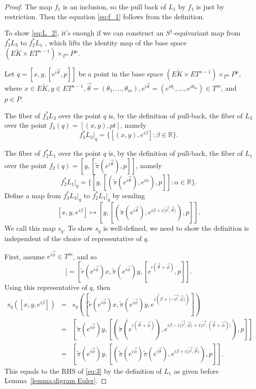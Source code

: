 \documentclass[12pt]{amsart}
\theoremstyle{definition}
\numberwithin{equation}{section}
\begin{document}
\begin{proof}
The map $f_{1}$ is an inclusion, so the pull back of $L_{1}$ by
$f_{1}$ is just by restriction. Then the equation \eqref{eq:f_1}
follows from the definition.

To show \eqref{eq:L_2}, it's enough if we can construct an
$S^1$-equivariant map from $f_{3}^{*}L_{3}$ to $f_{2}^{*}L_{1}$ ,
which lifts the identity map of the base space $(E\tilde{K}\times
ET^{n-1})\times_{T^m}P^{\mu}$.

Let $q= [x,y,[e^{i\vec{\theta}},p]]$ be a point in the base space
$(E\tilde{K}\times ET^{n-1})\times_{T^m}P^{\mu}$, where $x\in
E\tilde{K}, y\in ET^{n-1}, \vec{\theta}=(\theta_{1},...,\theta_{m}),
e^{i\vec{\theta}}=(e^{i\theta_{1}},...,e^{i\theta_{m}})\in T^m$, and
$p\in P$.

The fiber of $f_{3}^{*}L_{3}$ over the point $q$ is, by the
definition of pull-back, the fiber of $L_{3}$ over the point
$f_{3}(q)=[(x,y),pt]$, namely
\begin{equation}\label{eq:1}
f_{3}^{*}L_{3}|_{q}=\{[(x,y), e^{i\beta}]:\beta\in {{\mathbb{R}}}\}.
\end{equation}

 The fiber of
$f_{2}^{*}L_{1}$ over the point $q$ is, by the definition of
pull-back, the fiber of $L_{1}$ over the point $f_{2}(q)=[y,[
\tilde{\pi}(e^{i\vec{\theta}}),p]]$, namely
\begin{equation}\label{eq:2}
f_{2}^{*}L_{1}|_{q}=\{[y,[(\tilde{\pi}(e^{i\vec{\theta}}),e^{i\alpha}),p]]:
\alpha\in {{\mathbb{R}}}\}.
\end{equation}
Define a map from $f_{3}^{*}L_{3}|_{q}$ to $f_{2}^{*}L_{1}|_{q}$ by
sending
\begin{equation}\label{eq:3}
[x,y, e^{i\beta}]\mapsto
[y,[(\tilde{\pi}(e^{i\vec{\theta}}),e^{i\beta+i\langle
\vec{v^{l}},\vec{\theta}\rangle}),p]].
\end{equation}
We call this map $s_{q}$. To show $s_{q}$ is well-defined, we need
to show the definition is independent of the choice of
representative of $q$.

First, assume $e^{i\vec{\phi}}\in T^m$, and so
\begin{equation}
[x,y,[e^{i\vec{\theta}},p]]=[\tilde{r}(e^{i\vec{\phi}})x,\tilde{\pi}(e^{i\vec{\phi}})y,[e^{i(\vec{\theta}+\vec{\phi})},p]].
\end{equation}
Using this representative of $q$, then
\begin{eqnarray*}\label{eq:4}
s_{q}([x,y,e^{i\beta}])& = &
s_{q}([\tilde{r}(e^{i\vec{\phi}})x,\tilde{\pi}(e^{i\vec{\phi}})y,
e^{i(\beta+\langle -\vec{v^{l}},\vec{\phi}\rangle)}])\\
& = &
[\tilde{\pi}(e^{i\vec{\phi}})y,[(\tilde{\pi}(e^{i(\vec{\theta}+\vec{\phi})}),e^{i\beta-i\langle
\vec{v^{l}},\vec{\phi}\rangle
+i\langle\vec{v^{l}},(\vec{\theta}+\vec{\phi}) \rangle}),p]]\\
& = &
[\tilde{\pi}(e^{i\vec{\phi}})y,[(\tilde{\pi}(e^{i\vec{\phi}})\tilde{\pi}(e^{i\vec{\theta}}),e^{i\beta+i\langle
 \vec{v^{l}},\vec{\theta}\rangle}),p]].
\end{eqnarray*}
This equals to the
 RHS of \eqref{eq:3}
by the definition of $L_{1}$ as given before Lemma~\ref{lemma:digram
Euler}.


\end{proof}
\end{document}
